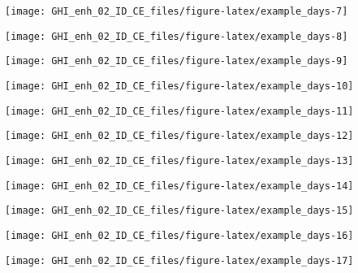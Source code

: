 \documentclass[
  10pt,
  a4paper,oneside]{article}
\begin{document}
\begin{center}\texttt{[image: GHI\_enh\_02\_ID\_CE\_files/figure-latex/example\_days-7]} \end{center}

\begin{center}\texttt{[image: GHI\_enh\_02\_ID\_CE\_files/figure-latex/example\_days-8]} \end{center}

\begin{center}\texttt{[image: GHI\_enh\_02\_ID\_CE\_files/figure-latex/example\_days-9]} \end{center}

\begin{center}\texttt{[image: GHI\_enh\_02\_ID\_CE\_files/figure-latex/example\_days-10]} \end{center}

\begin{center}\texttt{[image: GHI\_enh\_02\_ID\_CE\_files/figure-latex/example\_days-11]} \end{center}

\begin{center}\texttt{[image: GHI\_enh\_02\_ID\_CE\_files/figure-latex/example\_days-12]} \end{center}

\begin{center}\texttt{[image: GHI\_enh\_02\_ID\_CE\_files/figure-latex/example\_days-13]} \end{center}

\begin{center}\texttt{[image: GHI\_enh\_02\_ID\_CE\_files/figure-latex/example\_days-14]} \end{center}

\begin{center}\texttt{[image: GHI\_enh\_02\_ID\_CE\_files/figure-latex/example\_days-15]} \end{center}

\begin{center}\texttt{[image: GHI\_enh\_02\_ID\_CE\_files/figure-latex/example\_days-16]} \end{center}

\begin{center}\texttt{[image: GHI\_enh\_02\_ID\_CE\_files/figure-latex/example\_days-17]} \end{center}
\end{document}
